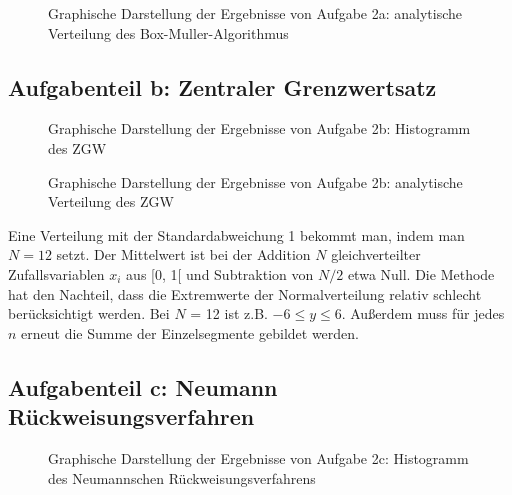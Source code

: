 \begin{landscape}
	\begin{figure}
		\caption{Graphische Darstellung der Ergebnisse von Aufgabe 2a: analytische Verteilung des Box-Muller-Algorithmus}
		\label{fig:2a_v}
	\end{figure}
\end{landscape}

\subsection*{Aufgabenteil b: Zentraler Grenzwertsatz}

\begin{landscape}
	\begin{figure}
		\caption{Graphische Darstellung der Ergebnisse von Aufgabe 2b: Histogramm des ZGW}
		\label{fig:2b}
	\end{figure}
\end{landscape}

\begin{landscape}
	\begin{figure}
		\caption{Graphische Darstellung der Ergebnisse von Aufgabe 2b: analytische Verteilung des ZGW}
		\label{fig:2b_v}
	\end{figure}
\end{landscape}

Eine Verteilung mit der Standardabweichung 1 bekommt man, indem man $N = 12$ setzt. Der Mittelwert ist bei der Addition $N$ gleichverteilter Zufallsvariablen $x_i$ aus [0, 1[ und Subtraktion von $N/2$ etwa Null. Die Methode hat den Nachteil, dass die Extremwerte der Normalverteilung relativ schlecht berücksichtigt werden. Bei $N$ = 12 ist z.B. $-6 \leq y \leq 6$. Außerdem muss für jedes $n$ erneut die Summe der Einzelsegmente gebildet werden. 

\subsection*{Aufgabenteil c: Neumann Rückweisungsverfahren}

\begin{landscape}
	\begin{figure}
		\caption{Graphische Darstellung der Ergebnisse von Aufgabe 2c: Histogramm des Neumannschen Rückweisungsverfahrens}
		\label{fig:2c}
	\end{figure}
\end{landscape}

